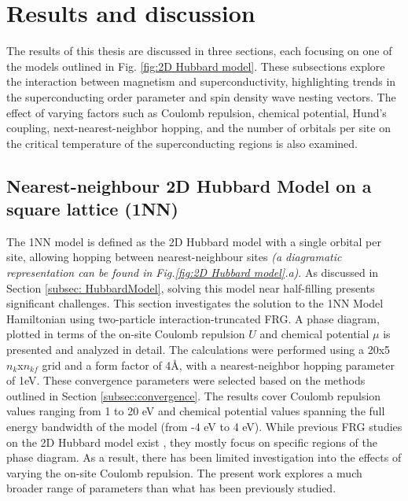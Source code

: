 \documentclass[12pt]{article}
\begin{document}
\section{Results and discussion}

The results of this thesis are discussed in three sections, each focusing on one of the models outlined in Fig. \ref{fig:2D Hubbard model}.
These subsections explore the interaction between magnetism and superconductivity, highlighting trends in the superconducting order parameter 
and spin density wave nesting vectors. The effect of varying factors such as Coulomb repulsion, 
chemical potential, Hund's coupling, next-nearest-neighbor hopping, and the number of orbitals per site 
on the critical temperature of the superconducting regions is also examined.

\subsection{Nearest-neighbour 2D Hubbard Model on a square lattice (1NN)}
\label{subsec:1NNModel}

The 1NN model is defined as the 2D Hubbard model with a single orbital per site,  allowing hopping between nearest-neighbour sites \textit{(a diagramatic representation can be found in Fig.\ref{fig:2D Hubbard model}.a)}. 
As discussed in Section \ref{subsec: HubbardModel}, solving this model near half-filling presents significant challenges. This section investigates the solution to the 1NN Model Hamiltonian using two-particle interaction-truncated FRG. A phase diagram, plotted in terms of the on-site Coulomb repulsion 
$U$ and chemical potential $\mu$ is presented and analyzed in detail. The calculations were performed using a 20x5 $n_k$x$n_{kf}$
grid and a form factor of 4\AA, with a nearest-neighbor hopping parameter of 1eV.
These convergence parameters were selected based on the methods outlined in Section \ref{subsec:convergence}. 
The results cover Coulomb repulsion values ranging from 1 to 20 eV and chemical potential values spanning the full energy bandwidth 
of the model (from -4 eV to 4 eV). While previous FRG studies on the 2D Hubbard model exist \cite{beyer2023rashba,hille2020quantitative,vilardi2020dynamical},
they mostly focus on specific regions of the phase diagram. As a result, there has been limited investigation into the effects of varying the on-site Coulomb repulsion.
The present work explores a much broader range of parameters than what has been previously studied.\par
\medskip
\end{document}
